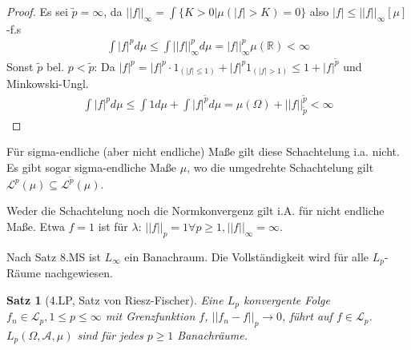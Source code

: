 \documentclass[]{article}
\newtheorem{theorem}{Satz}
\begin{document}
\begin{proof}
	Es sei $\tilde{p}=\infty$, da $||f||_\infty = \int\{K>0| \mu(|f|>K)=0\}$ also $|f| \leq ||f||_\infty [\mu]$-f.s
	\begin{align*}
		\int |f|^p d\mu \leq \int ||f||_\infty^p d\mu = |f||_\infty^p \mu(\mathbb{R}) < \infty
	\end{align*}
	Sonst $\tilde{p}$ bel. $p < \tilde{p}$: Da $|f|^p = |f|^p \cdot 1_{(|f|\leq 1)} + |f|^p 1_{(|f| >1)} \leq 1 + |f|^{\tilde{p}}$ und Minkowski-Ungl.
	\begin{align*}
		\int |f|^p d\mu \leq \int 1 d\mu + \int |f|^{\tilde{p}} d\mu = \mu(\Omega) + ||f||_{\tilde{p}}^{\tilde{p}} < \infty
	\end{align*}
\end{proof}

Für sigma-endliche (aber nicht endliche) Maße gilt diese Schachtelung i.a. nicht. Es gibt sogar sigma-endliche Maße $\mu$, wo die umgedrehte Schachtelung gilt $\mathcal{L}^p(\mu) \subseteq \mathcal{L}^{\tilde{p}}(\mu)$.

Weder die Schachtelung noch die Normkonvergenz gilt i.A. für nicht endliche Maße. Etwa $f=1$ ist für $\lambda$: $||f||_p = 1 \forall p \geq 1, ||f||_\infty = \infty$.

Nach Satz 8.MS ist $L_\infty$ ein Banachraum. Die Vollständigkeit wird für alle $L_p$-Räume nachgewiesen.

\begin{theorem}[4.LP, Satz von Riesz-Fischer]
	Eine $L_p$ konvergente Folge $f_n \in \mathcal{L}_p, 1 \leq p \leq \infty$ mit Grenzfunktion $f$, $||f_n - f||_p \rightarrow 0$, führt auf $f \in \mathcal{L}_p$. $L_p(\Omega, \mathcal{A}, \mu)$ sind für jedes $p \geq 1$ Banachräume.
\end{theorem}
\end{document}
